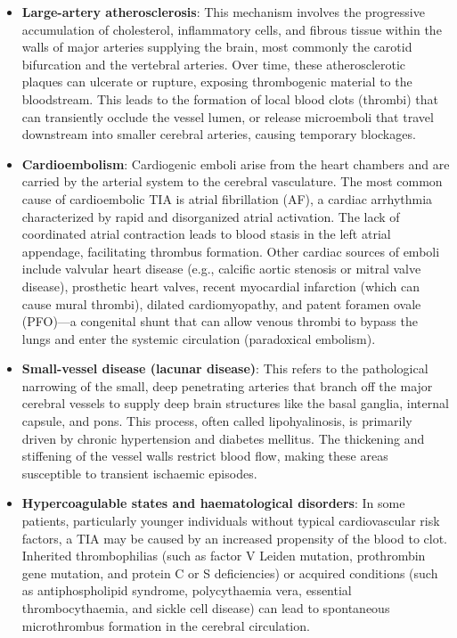 \begin{itemize}
    \item \textbf{Large-artery atherosclerosis}: This mechanism involves the progressive accumulation of cholesterol, inflammatory cells, and fibrous tissue within the walls of major arteries supplying the brain, most commonly the carotid bifurcation and the vertebral arteries. Over time, these atherosclerotic plaques can ulcerate or rupture, exposing thrombogenic material to the bloodstream. This leads to the formation of local blood clots (thrombi) that can transiently occlude the vessel lumen, or release microemboli that travel downstream into smaller cerebral arteries, causing temporary blockages.

    \item \textbf{Cardioembolism}: Cardiogenic emboli arise from the heart chambers and are carried by the arterial system to the cerebral vasculature. The most common cause of cardioembolic TIA is atrial fibrillation (AF), a cardiac arrhythmia characterized by rapid and disorganized atrial activation. The lack of coordinated atrial contraction leads to blood stasis in the left atrial appendage, facilitating thrombus formation. Other cardiac sources of emboli include valvular heart disease (e.g., calcific aortic stenosis or mitral valve disease), prosthetic heart valves, recent myocardial infarction (which can cause mural thrombi), dilated cardiomyopathy, and patent foramen ovale (PFO)---a congenital shunt that can allow venous thrombi to bypass the lungs and enter the systemic circulation (paradoxical embolism).

    \item \textbf{Small-vessel disease (lacunar disease)}: This refers to the pathological narrowing of the small, deep penetrating arteries that branch off the major cerebral vessels to supply deep brain structures like the basal ganglia, internal capsule, and pons. This process, often called lipohyalinosis, is primarily driven by chronic hypertension and diabetes mellitus. The thickening and stiffening of the vessel walls restrict blood flow, making these areas susceptible to transient ischaemic episodes.

    \item \textbf{Hypercoagulable states and haematological disorders}: In some patients, particularly younger individuals without typical cardiovascular risk factors, a TIA may be caused by an increased propensity of the blood to clot. Inherited thrombophilias (such as factor V Leiden mutation, prothrombin gene mutation, and protein C or S deficiencies) or acquired conditions (such as antiphospholipid syndrome, polycythaemia vera, essential thrombocythaemia, and sickle cell disease) can lead to spontaneous microthrombus formation in the cerebral circulation.


\end{itemize}

